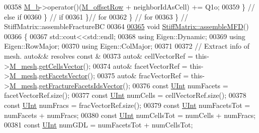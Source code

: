 \begin{DoxyCode}
00358                     \hyperlink{classFVCode3D_1_1StiffMatrix_a5bbfb34d8ef115d2806d5ded5ff109d0}{M\_b}->operator()(\hyperlink{classFVCode3D_1_1MatrixHandler_ad3faa8b15bca6e0052be8c868b924444}{M\_offsetRow} + neighborIdAsCell) += Q1o;
00359                 \} \textcolor{comment}{// else if}
00360             \} \textcolor{comment}{// if}
00361         \}\textcolor{comment}{// for}
00362     \} \textcolor{comment}{// for}
00363 \} \textcolor{comment}{// StiffMatrix::assembleFractureBC}
00364 
\hypertarget{Stiffness_8cpp_source.tex_l00365}{}\hyperlink{classFVCode3D_1_1StiffMatrix_ac3eb491563c1742f4adba021e397719b}{00365} \textcolor{keywordtype}{void} \hyperlink{classFVCode3D_1_1StiffMatrix_ac3eb491563c1742f4adba021e397719b}{StiffMatrix::assembleMFD}()
00366 \{
00367     std::cout<<std::endl;
00368     \textcolor{keyword}{using} Eigen::Dynamic;
00369     \textcolor{keyword}{using} Eigen::RowMajor;
00370     \textcolor{keyword}{using} Eigen::ColMajor;
00371     
00372     \textcolor{comment}{// Extract info of mesh. auto&& resolves const &}
00373     \textcolor{keyword}{auto}& cellVectorRef    = this->\hyperlink{classFVCode3D_1_1MatrixHandler_a72f185cb557fc2e8023bd09a074f685c}{M\_mesh}.\hyperlink{classFVCode3D_1_1Rigid__Mesh_afefb62f2c37317402b495e2369ed495b}{getCellsVector}();
00374     \textcolor{keyword}{auto}& facetVectorRef   = this->\hyperlink{classFVCode3D_1_1MatrixHandler_a72f185cb557fc2e8023bd09a074f685c}{M\_mesh}.\hyperlink{classFVCode3D_1_1Rigid__Mesh_a6d3cdd4ef8a5225599953179d5302636}{getFacetsVector}();
00375     \textcolor{keyword}{auto}& fracVectorRef    = this->\hyperlink{classFVCode3D_1_1MatrixHandler_a72f185cb557fc2e8023bd09a074f685c}{M\_mesh}.\hyperlink{classFVCode3D_1_1Rigid__Mesh_aadbe6d9ad704122537903396d91238e0}{getFractureFacetsIdsVector}();
00376     \textcolor{keyword}{const} \hyperlink{namespaceFVCode3D_a4bf7e328c75d0fd504050d040ebe9eda}{UInt} numFacets        = facetVectorRef.size();
00377     \textcolor{keyword}{const} \hyperlink{namespaceFVCode3D_a4bf7e328c75d0fd504050d040ebe9eda}{UInt} numCells         = cellVectorRef.size();
00378     \textcolor{keyword}{const} \hyperlink{namespaceFVCode3D_a4bf7e328c75d0fd504050d040ebe9eda}{UInt} numFracs         = fracVectorRef.size();
00379     \textcolor{keyword}{const} \hyperlink{namespaceFVCode3D_a4bf7e328c75d0fd504050d040ebe9eda}{UInt} numFacetsTot     = numFacets + numFracs;
00380     \textcolor{keyword}{const} \hyperlink{namespaceFVCode3D_a4bf7e328c75d0fd504050d040ebe9eda}{UInt} numCellsTot      = numCells + numFracs;
00381     \textcolor{keyword}{const} \hyperlink{namespaceFVCode3D_a4bf7e328c75d0fd504050d040ebe9eda}{UInt} numGDL           = numFacetsTot + numCellsTot;

\end{DoxyCode}
